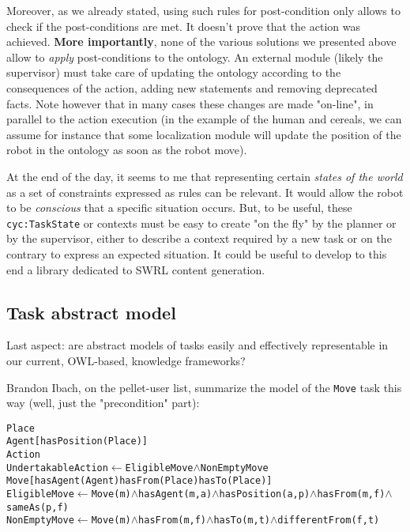 Moreover, as we already stated, using such rules for post-condition only allows
to check if the post-conditions are met. It doesn't prove that the action was
achieved. {\bf More importantly}, none of the various solutions we presented
above allow to \emph{apply} post-conditions to the ontology. An external module
(likely the supervisor) must take care of updating the ontology according to
the consequences of the action, adding new statements and removing deprecated
facts. Note however that in many cases these changes are made "on-line", in
parallel to the action execution (in the example of the human and cereals, we
can assume for instance that some localization module will update the position
of the robot in the ontology as soon as the robot move).

At the end of the day, it seems to me that representing certain \emph{states of
the world} as a set of constraints expressed as rules can be relevant. It would
allow the robot to be \emph{conscious} that a specific situation occurs. But,
to be useful, these {\tt cyc:TaskState} or contexts must be easy to create "on
the fly" by the planner or by the supervisor, either to describe a context
required by a new task or on the contrary to express an expected situation. It
could be useful to develop to this end a library dedicated to SWRL content
generation.


\subsection{Task abstract model}

Last aspect: are abstract models of tasks easily and effectively representable
in our current, OWL-based, knowledge frameworks?

Brandon Ibach, on the pellet-user list, summarize the model of the {\tt Move}
task this way (well, just the "precondition" part):

\begin{alltt}

Place
Agent [ hasPosition(Place) ]
Action
    UndertakableAction \(\leftarrow\) EligibleMove \(\land\) NonEmptyMove
    Move [ hasAgent(Agent) hasFrom(Place) hasTo(Place) ]
        EligibleMove \(\leftarrow\) Move(m) \(\land\) hasAgent(m, a) \(\land\) hasPosition(a, p) \(\land\) hasFrom(m, f) \(\land\)
sameAs(p, f)
        NonEmptyMove \(\leftarrow\) Move(m) \(\land\) hasFrom(m, f) \(\land\) hasTo(m, t) \(\land\) differentFrom(f, t)

\end{alltt}

